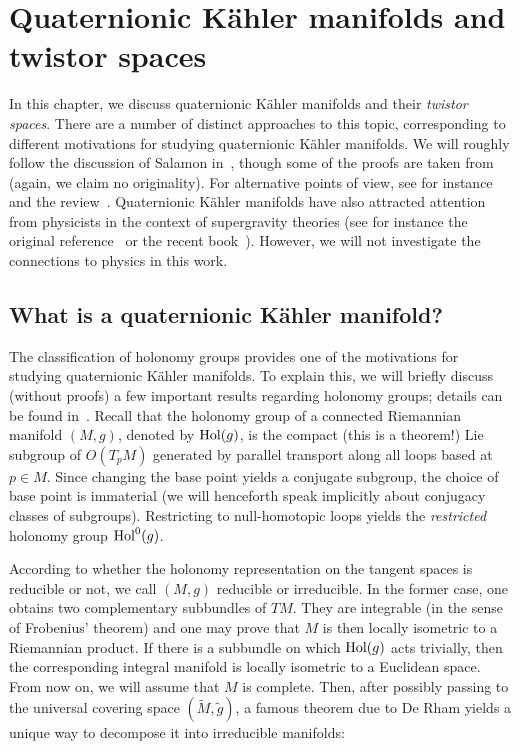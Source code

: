 \chapter{Quaternionic K\"ahler manifolds and twistor spaces}
\label{chap:twistor}

In this chapter, we discuss quaternionic K\"ahler manifolds and their \emph{twistor spaces}. There are a number of distinct approaches to this topic, corresponding to different motivations for studying quaternionic K\"ahler manifolds. We will roughly follow the discussion of Salamon in~\cite{Sal1982}, though some of the proofs are taken from~\cite{Bes2008} (again, we claim no originality). For alternative points of view, see for instance~\cite{BO1984,Sal1984,Sal1986} and the review~\cite{Sal1999}. Quaternionic K\"ahler manifolds have also attracted attention from physicists in the context of supergravity theories (see for instance the original reference~\cite{BW1983} or the recent book~\cite{Cor2010}). However, we will not investigate the connections to physics in this work.

\section{What is a quaternionic K\"ahler manifold?}

The classification of holonomy groups provides one of the motivations for studying quaternionic K\"ahler manifolds. To explain this, we will briefly discuss (without proofs) a few important results regarding holonomy groups; details can be found in~\cite{KN1963,Bes2008,Joy2000a}. Recall that the holonomy group of a connected Riemannian manifold $(M,g)$, denoted by $\operatorname{Hol}(g)$, is the compact (this is a theorem!) Lie subgroup of $O(T_pM)$ generated by parallel transport along all loops based at $p\in M$. Since changing the base point yields a conjugate subgroup, the choice of base point is immaterial (we will henceforth speak implicitly about conjugacy classes of subgroups). Restricting to null-homotopic loops yields the \emph{restricted} holonomy group $\operatorname{Hol}^0(g)$.

According to whether the holonomy representation on the tangent spaces is reducible or not, we call $(M,g)$ reducible or irreducible. In the former case, one obtains two complementary subbundles of $TM$. They are integrable (in the sense of Frobenius' theorem) and one may prove that $M$ is then locally isometric to a Riemannian product. If there is a subbundle on which $\operatorname{Hol}(g)$ acts trivially, then the corresponding integral manifold is locally isometric to a Euclidean space. From now on, we will assume that $M$ is complete. Then, after possibly passing to the universal covering space $(\tilde M,\tilde g)$, a famous theorem due to De Rham yields a unique way to decompose it into irreducible manifolds:

